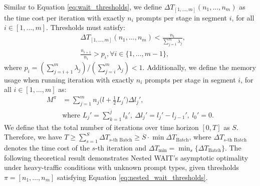 Similar to Equation \eqref{eq:wait_thresholds}, we define \( \Delta T_{[1,\dots,m]}(n_1, \dots, n_m) \) as the time cost per iteration with exactly \( n_i \) prompts per stage in segment \( i \), for all \( i \in [1, \dots, m] \). Thresholds must satisfy:
\begin{equation}
    \label{eq:nested_wait_thresholds}
    \begin{aligned}
    &\Delta T_{[1,\dots,m]}(n_1, \dots, n_m) <\frac{n_1}{\sum_{j=1}^m \lambda_j}, \\
    &\frac{n_{i+1}}{n_i} > p_i,\forall i \in \{1, \dots, m-1\},
    \end{aligned}
\end{equation}
where $p_i = (\sum_{j=i+1}^m\lambda_j)/(\sum_{j=i}^m\lambda_j)<1.$ Additionally, we define the memory usage when running iteration with exactly \( n_i \) prompts per stage in segment \( i \), for all \( i \in [1, \dots, m] \) as:
\begin{equation}
    \label{eq:nested_wait_memory}
\begin{aligned}
        M^\pi &= \sum_{j=1}^m n_j \big(l + \tfrac{1}{2}L_j'\big) \Delta l_j', \\
    &\text{where } L_j' = \sum_{k=1}^j l_k',\ \Delta l_j' = l_j' - l_{j-1}',\ l_0' = 0. 
\end{aligned}
\end{equation}   
 We define that the total number of iterations over time horizon $[0,T]$ as $ S$. Therefore, we have $T\ge\sum_{s=1}^S \Delta T_{s\text{-th Batch}}\geq S\cdot \min \Delta T_{\text{Batch}}$, where $ \Delta T_{s\text{-th Batch}}$ denotes the time cost of the $s$-th iteration and $\Delta T_{\min}=\min_s\{\Delta T_{\text{Batch}}\}$.
The following theoretical result demonstrates Nested WAIT’s asymptotic optimality under heavy-traffic conditions with unknown prompt types, given thresholds \( \pi = [n_1, \dots, n_m] \) satisfying Equation \eqref{eq:nested_wait_thresholds}.

